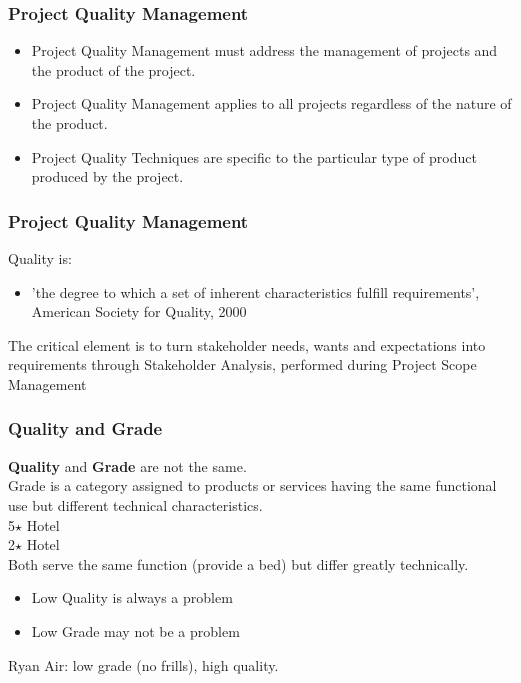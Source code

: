\begin{frame}
\frametitle{Project Quality Management}
\begin{itemize}
	\item Project Quality Management must address the management of projects and the product of the project.
	\item Project Quality Management applies to all projects regardless of the nature of the product.
	\item Project Quality Techniques are specific to the particular type of product produced by the project.
\end{itemize}
\end{frame}




\begin{frame}
\frametitle{Project Quality Management}

Quality is:
\begin{itemize}
\item 'the degree to which a set of inherent characteristics fulfill requirements', American Society for Quality, 2000
\end{itemize}
The critical element is to turn stakeholder needs, wants and expectations into requirements through Stakeholder Analysis, performed during Project Scope Management
\end{frame}




\begin{frame}
\frametitle{Quality and Grade}
\textbf{Quality} and \textbf{Grade} are not the same.  \\
Grade is a category assigned to products or services having the same functional use but different technical characteristics. \\
\hspace{1cm} 5$\star$ Hotel\\
\hspace{1cm} 2$\star$ Hotel\\
Both serve the same function (provide a bed) but differ greatly technically.
\begin{itemize}
	\item Low Quality is always a problem
	\item Low Grade may not be a problem
\end{itemize}
Ryan Air: low grade (no frills), high quality.
\end{frame}




